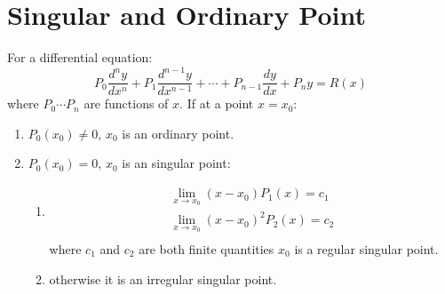 \section{Singular and Ordinary Point}
For a differential equation:
\begin{equation}
	P_0 \dfrac{d^n y}{dx^n}+P_1 \dfrac{d^{n-1}y}{dx^{n-1}}+\cdots+P_{n-1} \dfrac{dy}{dx}+P_n y=R(x)
\end{equation}
where $P_0 \cdots P_n$ are functions of $x$.\newline
If at a point $x=x_0$:
\begin{enumerate}
	\item $P_0(x_0) \neq 0$, $x_0$ is an ordinary point.
	\item $P_0(x_0)=0$, $x_0$ is an singular point: \begin{enumerate}
		\item \begin{align}
			\lim_{x\to x_0}(x-x_0)P_1(x)=c_1\\
			\lim_{x\to x_0}(x-x_0)^2P_2(x)=c_2\\
		\end{align}
		where $c_1$ and $c_2$ are both finite quantities $x_0$ is a regular singular point.
		\item otherwise it is an irregular singular point.
	\end{enumerate}
\end{enumerate}
